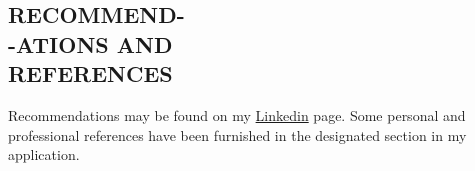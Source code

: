 \documentclass[margin, 10pt]{res} %
\begin{document}
\begin{resume}

\section{RECOMMEND- \\-ATIONS AND \\ REFERENCES } 
Recommendations may be found on my \href{https://www.linkedin.com/in/ikramu/}{Linkedin} page. Some personal and professional references have been furnished in the designated section in my application.


\end{resume}
\end{document}
